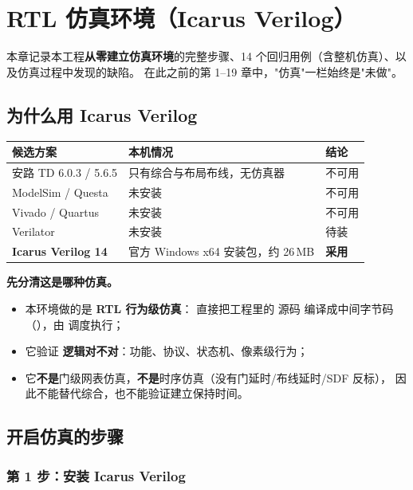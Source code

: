 \section{RTL 仿真环境（Icarus Verilog）}

本章记录本工程\textbf{从零建立仿真环境}的完整步骤、14 个回归用例（含整机仿真）、以及仿真过程中发现的缺陷。
在此之前的第 1--19 章中，"仿真"一栏始终是"未做"。

\subsection{为什么用 Icarus Verilog}

\begin{center}
\small
\begin{tabular}{lll}
\toprule
候选方案 & 本机情况 & 结论\\
\midrule
安路 TD 6.0.3 / 5.6.5 & 只有综合与布局布线，无仿真器 & 不可用\\
ModelSim / Questa & 未安装 & 不可用\\
Vivado / Quartus & 未安装 & 不可用\\
Verilator & 未安装 & 待装\\
\textbf{Icarus Verilog 14} & 官方 Windows x64 安装包，约 26\,MB & \textbf{采用}\\
\bottomrule
\end{tabular}
\end{center}

\begin{tipbox}
\textbf{先分清这是哪种仿真。}
\begin{itemize}[leftmargin=1.6em,itemsep=1pt]
\item 本环境做的是 \textbf{RTL 行为级仿真}： 直接把工程里的  源码
      编译成中间字节码（），由  调度执行；
\item 它验证 \textbf{逻辑对不对}：功能、协议、状态机、像素级行为；
\item 它\textbf{不是}门级网表仿真，\textbf{不是}时序仿真（没有门延时/布线延时/SDF 反标），
      因此不能替代综合，也不能验证建立保持时间。
\end{itemize}
\end{tipbox}

\subsection{开启仿真的步骤}

\subsubsection{第 1 步：安装 Icarus Verilog}

